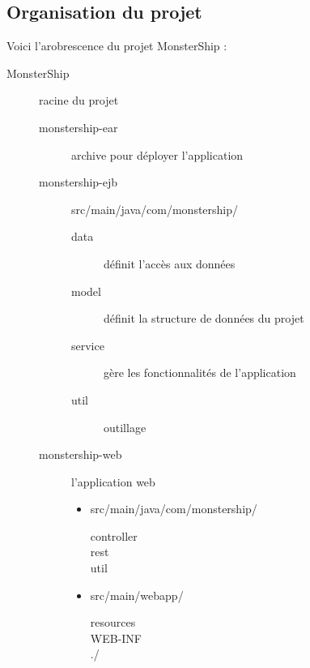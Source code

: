 \documentclass[a4paper,11pt]{report}
\begin{document}
    \subsection{Organisation du projet}
      Voici l'arobrescence du projet MonsterShip :
      \begin{description}
        \item[MonsterShip] racine du projet
        \begin{description}
          \item[monstership-ear] archive pour déployer l'application
          \item[monstership-ejb] src/main/java/com/monstership/
          \begin{description}
            \item[data] définit l'accès aux données
            \item[model] définit la structure de données du projet
            \item[service] gère les fonctionnalités de l'application 
            \item[util] outillage
          \end{description}
          \item[monstership-web] l'application web
          \begin{itemize}
            \item src/main/java/com/monstership/
            \begin{description}
              \item[controller]
              \item[rest]
              \item[util] 
            \end{description}
            \item src/main/webapp/
            \begin{description}
              \item[resources] 
              \item[WEB-INF]
              \item[./] 
            \end{description}
          \end{itemize}
        \end{description}
      \end{description}
\end{document}

